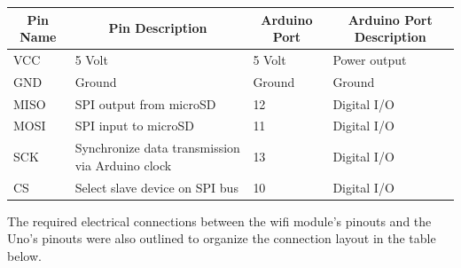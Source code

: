 \documentclass[12pt, titlepage]{article}
\begin{document}
\begin{table}[H]
  \centering
  \begin{tabular}{|p{2cm}|p{6cm}|p{2cm}|p{2cm}|}
  \hline
  \multicolumn{1}{|c|}{\textbf{Pin Name}} & \multicolumn{1}{c|}{\textbf{Pin Description}} & \multicolumn{1}{|c|}{\textbf{Arduino Port}} & \multicolumn{1}{|c|}{\textbf{Arduino Port Description}} 
  \\ \hline
  VCC
  & 5 Volt
  & 5 Volt
  & Power output
  \newline                                
  \\ \hline

  GND                              
  & Ground
  & Ground
  & Ground
  \newline                                
  \\ \hline

  MISO                          
  & SPI output from microSD
  & 12
  & Digital I/O
  \newline                                
  \\ \hline

  MOSI                                
  & SPI input to microSD
  & 11 
  & Digital I/O
  \newline                            
  \\ \hline

  SCK                                
  & Synchronize data transmission via Arduino clock
  & 13 
  & Digital I/O
  \newline                            
  \\ \hline

  CS                                
  & Select slave device on SPI bus
  & 10 
  & Digital I/O
  \newline                            
  \\ \hline

  \end{tabular}
\end{table}


The required electrical connections between the wifi module's pinouts and the Uno's pinouts were also outlined to organize the connection layout in the table below. \\
\end{document}
